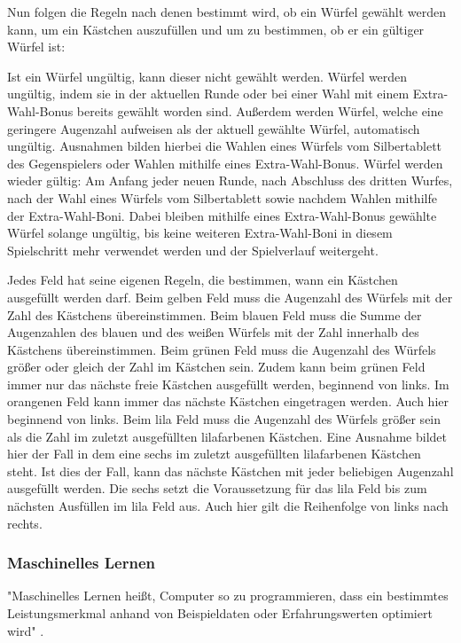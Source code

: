 Nun folgen die Regeln nach denen bestimmt wird, ob ein Würfel gewählt werden kann, um ein Kästchen auszufüllen und um zu bestimmen, ob er ein gültiger Würfel ist:

Ist ein Würfel ungültig, kann dieser nicht gewählt werden. Würfel werden ungültig, indem sie in der aktuellen Runde oder bei einer Wahl mit einem Extra-Wahl-Bonus bereits gewählt worden sind. Außerdem werden Würfel, welche eine geringere Augenzahl aufweisen als der aktuell gewählte Würfel, automatisch ungültig. Ausnahmen bilden hierbei die Wahlen eines Würfels vom Silbertablett des Gegenspielers oder Wahlen mithilfe eines Extra-Wahl-Bonus. Würfel werden wieder gültig: Am Anfang jeder neuen Runde, nach Abschluss des dritten Wurfes, nach der Wahl eines Würfels vom Silbertablett sowie nachdem Wahlen mithilfe der Extra-Wahl-Boni. Dabei bleiben mithilfe eines Extra-Wahl-Bonus gewählte Würfel solange ungültig, bis keine weiteren Extra-Wahl-Boni in diesem Spielschritt mehr verwendet werden und der Spielverlauf weitergeht.

Jedes Feld hat seine eigenen Regeln, die bestimmen, wann ein Kästchen ausgefüllt werden darf. Beim gelben Feld muss die Augenzahl des Würfels mit der Zahl des Kästchens übereinstimmen. Beim blauen Feld muss die Summe der Augenzahlen des blauen und des weißen Würfels mit der Zahl innerhalb des Kästchens übereinstimmen. Beim grünen Feld muss die Augenzahl des Würfels größer oder gleich der Zahl im Kästchen sein. Zudem kann beim grünen Feld immer nur das nächste freie Kästchen ausgefüllt werden, beginnend von links. Im orangenen Feld kann immer das nächste Kästchen eingetragen werden. Auch hier beginnend von links. Beim lila Feld muss die Augenzahl des Würfels größer sein als die Zahl im zuletzt ausgefüllten lilafarbenen Kästchen. Eine Ausnahme bildet hier der Fall in dem eine sechs im zuletzt ausgefüllten lilafarbenen Kästchen steht. Ist dies der Fall, kann das nächste Kästchen mit jeder beliebigen Augenzahl ausgefüllt werden. Die sechs setzt die Voraussetzung für das lila Feld bis zum nächsten Ausfüllen im lila Feld aus. Auch hier gilt die Reihenfolge von links nach rechts.

\subsubsection{Maschinelles Lernen}
"Maschinelles Lernen heißt, Computer so zu programmieren, dass ein bestimmtes Leistungsmerkmal anhand von Beispieldaten oder Erfahrungswerten optimiert wird" \cite[S. 3]{alpaydin_maschinelles_2022}.

